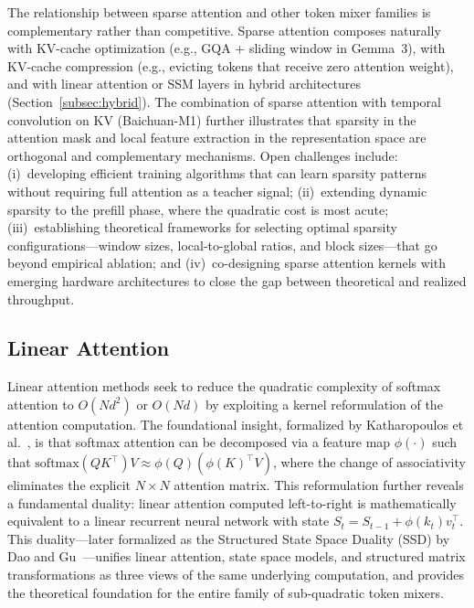 The relationship between sparse attention and other token mixer families is complementary rather than competitive. Sparse attention composes naturally with KV-cache optimization (e.g., GQA + sliding window in Gemma~3), with KV-cache compression (e.g., evicting tokens that receive zero attention weight), and with linear attention or SSM layers in hybrid architectures (Section~\ref{subsec:hybrid}). The combination of sparse attention with temporal convolution on KV (Baichuan-M1) further illustrates that sparsity in the attention mask and local feature extraction in the representation space are orthogonal and complementary mechanisms. Open challenges include: (i)~developing efficient training algorithms that can learn sparsity patterns without requiring full attention as a teacher signal; (ii)~extending dynamic sparsity to the prefill phase, where the quadratic cost is most acute; (iii)~establishing theoretical frameworks for selecting optimal sparsity configurations---window sizes, local-to-global ratios, and block sizes---that go beyond empirical ablation; and (iv)~co-designing sparse attention kernels with emerging hardware architectures to close the gap between theoretical and realized throughput.


\subsection{Linear Attention}
\label{subsec:linear-attn}

Linear attention methods seek to reduce the quadratic complexity of softmax attention to $O(Nd^2)$ or $O(Nd)$ by exploiting a kernel reformulation of the attention computation. The foundational insight, formalized by Katharopoulos et al.~\cite{katharopoulos2020transformers}, is that softmax attention can be decomposed via a feature map $\phi(\cdot)$ such that $\text{softmax}(QK^\top)V \approx \phi(Q)(\phi(K)^\top V)$, where the change of associativity eliminates the explicit $N \times N$ attention matrix. This reformulation further reveals a fundamental duality: linear attention computed left-to-right is mathematically equivalent to a linear recurrent neural network with state $S_t = S_{t-1} + \phi(k_t)v_t^\top$. This duality---later formalized as the Structured State Space Duality (SSD) by Dao and Gu~\cite{dao2024transformers}---unifies linear attention, state space models, and structured matrix transformations as three views of the same underlying computation, and provides the theoretical foundation for the entire family of sub-quadratic token mixers.

